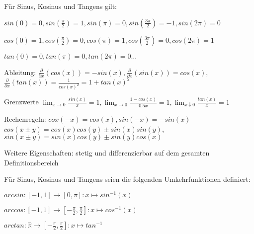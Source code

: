 \documentclass[]{article}
\begin{document}
\begin{definition}[Eigenschaften]
	Für Sinus, Kosinus und Tangens gilt:
	\begin{description}[noitemsep]
		\item $sin(0) = 0, sin( \frac{\pi}{2})=1, sin(\pi) = 0, sin(\frac{3 \pi}{2}) = -1, sin(2 \pi) = 0$
		\item $cos(0) = 1, cos (\frac{\pi}{2}) = 0, cos (\pi) = 1, cos(\frac{3 \pi}{2}) = 0, cos (2 \pi) = 1$
		\item $tan(0) = 0, tan(\pi) = 0, tan(2 \pi) = 0 \dots$
		\item Ableitung: $\frac{\partial}{\partial x}(cos(x)) = -sin(x), \frac{\partial}{\partial x}(sin(x)) = cos(x)$, \\ $\frac{\partial}{\partial x}(tan(x)) = \frac{1}{cos(x)^2} = 1 + tan(x)^2$
		\item Grenzwerte $\lim_{x \rightarrow 0} \frac{sin(x)}{x} = 1, \lim_{x \rightarrow 0} \frac{1 - cos(x)}{0.5x} = 1, \lim_{x \downarrow 0} \frac{tan (x)}{x} = 1$
		\item Rechenregeln: $cox(-x) = cos(x), sin(-x) = -sin(x)$ \\ $cos(x \pm y) = cos(x)cos(y) \pm sin(x)sin(y)$, \\ $sin(x \pm y) = sin(x)cos(y) \pm sin(y)cos(x)$
		\item Weitere Eigenschaften: stetig und differenzierbar auf dem gesamten Definitionsbereich
	\end{description}
\end{definition}

\pagebreak

\begin{definition}[Umkehrfunktionen]
Für Sinus, Kosinus und Tangens seien die folgenden Umkehrfunktionen definiert:
	\begin{multicols}{2}
		
	
			\begin{description}[noitemsep]
				\item $arcsin : [-1,1] \rightarrow [0, \pi] : x \mapsto sin^{-1}(x) $
				\item $arccos : [-1,1] \rightarrow [-\frac{\pi}{2},\frac{\pi}{2}] : x \mapsto cos^{-1}(x) $
				\item $arctan : \mathbb{R} \rightarrow [-\frac{\pi}{2},\frac{\pi}{2}] : x \mapsto tan^{-1} $
			\end{description}
	
	\end{multicols}
\end{definition}
\end{document}
